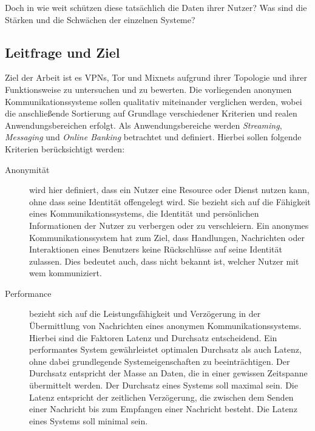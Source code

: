 Doch in wie weit schützen diese tatsächlich die Daten ihrer Nutzer? Was sind die Stärken und die Schwächen der einzelnen Systeme?

\subsection{Leitfrage und Ziel}

Ziel der Arbeit ist es VPNs, Tor und Mixnets aufgrund ihrer Topologie und ihrer Funktionsweise zu untersuchen und zu bewerten. Die vorliegenden anonymen Kommunikationssysteme sollen qualitativ miteinander verglichen werden, wobei die anschließende Sortierung auf Grundlage verschiedener Kriterien und realen Anwendungsbereichen erfolgt. Als Anwendungsbereiche werden \textit{Streaming}, \textit{Messaging} und \textit{Online Banking} betrachtet und definiert. Hierbei sollen folgende Kriterien berücksichtigt werden:

\begin{description}
    \item[Anonymität] wird hier definiert, dass ein Nutzer eine Resource oder Dienst nutzen kann, ohne dass seine Identität offengelegt wird. Sie bezieht sich auf die Fähigkeit eines Kommunikationssystems, die Identität und persönlichen Informationen der Nutzer zu verbergen oder zu verschleiern. Ein anonymes Kommunikationssystem hat zum Ziel, dass Handlungen, Nachrichten oder Interaktionen eines Benutzers keine Rückschlüsse auf seine Identität zulassen. Dies bedeutet auch, dass nicht bekannt ist, welcher Nutzer mit wem kommuniziert\cite{DefinitionOfAnonymity}.

    \item[Performance] bezieht sich auf die Leistungsfähigkeit und Verzögerung in der Übermittlung von Nachrichten eines anonymen Kommunikationssystems. Hierbei sind die Faktoren Latenz und Durchsatz entscheidend. Ein performantes System gewährleistet optimalen Durchsatz als auch Latenz, ohne dabei grundlegende Systemeigenschaften zu beeinträchtigen. Der Durchsatz entspricht der Masse an Daten, die in einer gewissen Zeitspanne übermittelt werden. Der Durchsatz eines Systems soll maximal sein. Die Latenz entspricht der zeitlichen Verzögerung, die zwischen dem Senden einer Nachricht bis zum Empfangen einer Nachricht besteht. Die Latenz eines Systems soll minimal sein\cite{ComputerNetworkPerformanceAnalysis}.
\end{description}
